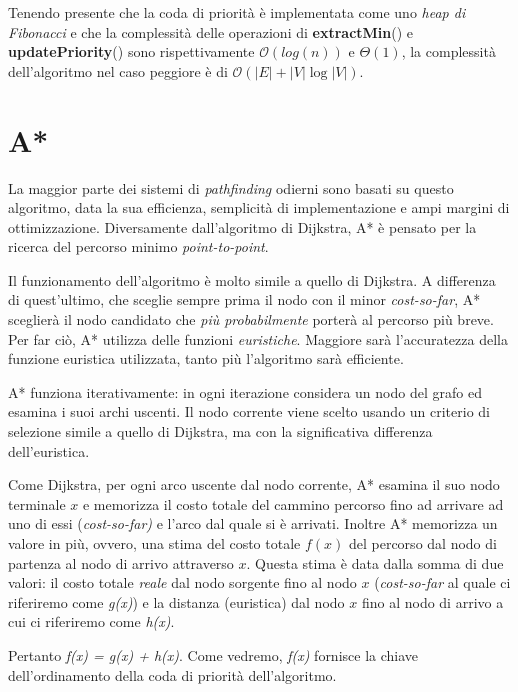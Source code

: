 \documentclass[11pt]{book}
\begin{document}
\par{
Tenendo presente che la coda di priorit\`a \`e implementata come uno \emph{heap di Fibonacci} e che la complessit\`a delle operazioni di \textbf{extractMin}() e \textbf{updatePriority}() sono rispettivamente $\mathcal{O}(log(n))$ e $\Theta(1)$, la complessit\`a dell'algoritmo nel caso peggiore \`e di $\mathcal{O}(|E| + |V| \log|V|)$.
}
\section{A*}
\label{sec:astar}
La maggior parte dei sistemi di \emph{pathfinding} odierni sono basati su questo algoritmo, data la sua efficienza, semplicit\`a di implementazione e ampi margini di ottimizzazione.
Diversamente dall'algoritmo di Dijkstra, A* \`e pensato per la ricerca del percorso minimo \emph{point-to-point}.
\par{
Il funzionamento dell'algoritmo \`e molto simile a quello di Dijkstra. A differenza di quest'ultimo, che sceglie sempre prima il nodo con il minor \emph{cost-so-far}, A* sceglier\`a il nodo candidato che \emph{pi\`u probabilmente} porter\`a al percorso pi\`u breve. Per far ci\`o, A* utilizza delle funzioni \emph{euristiche}. Maggiore sar\`a l'accuratezza della funzione euristica utilizzata, tanto pi\`u l'algoritmo sar\`a efficiente.
}
\par{
A* funziona iterativamente: in ogni iterazione considera un nodo del grafo ed esamina i suoi archi uscenti. Il nodo corrente viene scelto usando un criterio di selezione simile a quello di Dijkstra, ma con la significativa differenza dell'euristica.
}
\par{
Come Dijkstra, per ogni arco uscente dal nodo corrente, A* esamina il suo nodo terminale $x$ e memorizza il costo totale del cammino percorso fino ad arrivare ad uno di essi (\emph{cost-so-far)} e l'arco dal quale si \`e arrivati. Inoltre A* memorizza un valore in pi\`u, ovvero, una stima del costo totale $f(x)$ del percorso dal nodo di partenza al nodo di arrivo attraverso $x$. Questa stima \`e data dalla somma di due valori: il costo totale \emph{reale} dal nodo sorgente fino al nodo $x$ (\emph{cost-so-far} al quale ci riferiremo come \emph{g(x)}) e la distanza (euristica) dal nodo $x$ fino al nodo di arrivo a cui ci riferiremo come \emph{h(x)}.
}
\par{
Pertanto \emph{f(x) = g(x) + h(x)}. Come vedremo, \emph{f(x)} fornisce la chiave dell'ordinamento della coda di priorit\`a dell'algoritmo}.
\end{document}
